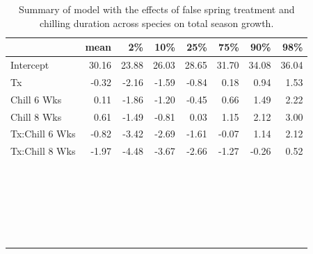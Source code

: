 \documentclass{article}\usepackage[]{graphicx}\usepackage[]{color}
\begin{document}
\begin{longtable}{lrrrrrrr}
\caption{Summary of model with the effects of false spring treatment and chilling duration across species on total season growth.} \\ 
  \hline
 & mean & 2\% & 10\% & 25\% & 75\% & 90\% & 98\% \\ 
  \hline \endhead  \hline
Intercept & 30.16 & 23.88 & 26.03 & 28.65 & 31.70 & 34.08 & 36.04 \\ 
  Tx & -0.32 & -2.16 & -1.59 & -0.84 & 0.18 & 0.94 & 1.53 \\ 
  Chill 6 Wks & 0.11 & -1.86 & -1.20 & -0.45 & 0.66 & 1.49 & 2.22 \\ 
  Chill 8 Wks & 0.61 & -1.49 & -0.81 & 0.03 & 1.15 & 2.12 & 3.00 \\ 
  Tx:Chill 6 Wks & -0.82 & -3.42 & -2.69 & -1.61 & -0.07 & 1.14 & 2.12 \\ 
  Tx:Chill 8 Wks & -1.97 & -4.48 & -3.67 & -2.66 & -1.27 & -0.26 & 0.52 \\ 
   &  &  &  &  &  &  &  \\ 
   &  &  &  &  &  &  &  \\ 
   &  &  &  &  &  &  &  \\ 
   &  &  &  &  &  &  &  \\ 
   &  &  &  &  &  &  &  \\ 
   &  &  &  &  &  &  &  \\ 
   &  &  &  &  &  &  &  \\ 
   &  &  &  &  &  &  &  \\ 
   &  &  &  &  &  &  &  \\ 
   &  &  &  &  &  &  &  \\ 
   &  &  &  &  &  &  &  \\ 
   &  &  &  &  &  &  &  \\ 
   &  &  &  &  &  &  &  \\ 
   &  &  &  &  &  &  &  \\ 
   &  &  &  &  &  &  &  \\ 
   &  &  &  &  &  &  &  \\ 
   &  &  &  &  &  &  &  \\ 
   &  &  &  &  &  &  &  \\ 
   &  &  &  &  &  &  &  \\ 
   &  &  &  &  &  &  &  \\ 
   &  &  &  &  &  &  &  \\ 
   &  &  &  &  &  &  &  \\ 
   &  &  &  &  &  &  &  \\ 
   &  &  &  &  &  &  &  \\ 

\end{longtable}
\end{document}
